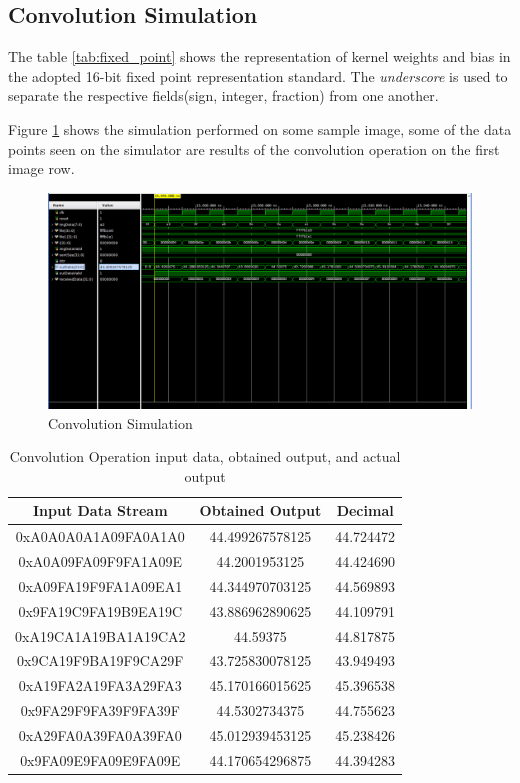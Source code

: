     \subsection{Convolution Simulation}
    \noindent The table \ref{tab:fixed_point} shows the representation of kernel weights and bias in the adopted 16-bit fixed point representation standard. The \textit{underscore} is used to separate the respective fields(sign, integer, fraction) from one another. 

    \noindent 
    Figure \ref{fig:conv_tb_simulation} shows the simulation performed on some sample image, some of the data points seen on the simulator are results of the convolution operation on the first image row. 

    \begin{figure}
        \centering
        \includegraphics[width=1\linewidth]{images/simulationWaveform.png}
        \caption{Convolution Simulation}
        \label{fig:conv_tb_simulation}
    \end{figure}

    \begin{table}[ht]
    \centering
    \begin{tabular}{|c|c|c|}
        \hline
        \textbf{Input Data Stream} & \textbf{Obtained Output} & \textbf{Decimal} \\
        \hline
        0xA0A0A0A1A09FA0A1A0 & 44.499267578125 & 44.724472 \\
        0xA0A09FA09F9FA1A09E & 44.2001953125 & 44.424690 \\
        0xA09FA19F9FA1A09EA1 & 44.344970703125 & 44.569893 \\
        0x9FA19C9FA19B9EA19C & 43.886962890625 & 44.109791 \\
        0xA19CA1A19BA1A19CA2 & 44.59375 & 44.817875 \\
        0x9CA19F9BA19F9CA29F & 43.725830078125 & 43.949493 \\
        0xA19FA2A19FA3A29FA3 & 45.170166015625 & 45.396538 \\
        0x9FA29F9FA39F9FA39F & 44.5302734375 & 44.755623 \\
        0xA29FA0A39FA0A39FA0 & 45.012939453125 & 45.238426 \\
        0x9FA09E9FA09E9FA09E & 44.170654296875 & 44.394283 \\
        \hline
    \end{tabular}
    \caption{Convolution Operation input data, obtained output, and actual output}
    \label{tab:data_stream}
\end{table}

